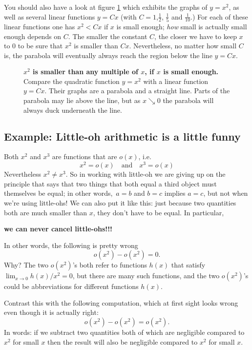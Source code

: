 You should also have a look at figure \ref{fig:parabola-wins} which
exhibits the graphs of $y=x^2$, as well as several linear functions $y=Cx$
(with $C=1$,$\frac12$, $\frac15$ and $\frac1{10}$.) For each of these
linear functions one has $x^2<Cx$ if $x$ is small enough; \textit{how}
small is actually small enough depends on $C$. The smaller the constant
$C$, the closer we  have to keep $x$ to $0$ to be sure that $x^2$ is
smaller than $Cx$. Nevertheless, no matter how small $C$ is, the parabola
will eventually always reach the region below the line $y=Cx$.
\begin{figure}[t]
  \centering \small  \normalsize
  \caption{\textbf{$x^2$ is smaller than any multiple of $x$, if $x$ is
  small enough. } Compare the quadratic function $y=x^2$ with a linear
  function $y=Cx$.  Their graphs are a parabola and a straight line.
  Parts of the parabola may lie above the line, but as $x\searrow0$ the
  parabola will always duck underneath the line.  }
  \label{fig:parabola-wins}
\end{figure}

\subsection{Example: Little-oh arithmetic is a little funny} %
\label{sec:little-oh-weirdness}
Both $x^2$ and $x^3$ are functions that are $o (x)$, i.e.
\[
x^2=o (x) \quad\text{and}\quad x^3=o (x)
\]
Nevertheless $x^2\neq x^3$. So in working with little-oh we are giving up
on the principle that says that two things that both equal a third object
must themselves be equal; in other words,~$a=b$ and $b=c$ implies $a=c$,
but not when we're using little-ohs! We can also put it like this: just
because two quantities both are much smaller than $x$, they don't have to
be equal. In particular,
\begin{center}\color{badgerred}
  \textbf{we can never cancel little-ohs!!! }
\end{center}
In other words, the following is pretty wrong
\[
o (x^2)-o (x^2)=0.
\]
Why? The two $o (x^2)$'s both refer to functions $h (x)$ that satisfy
$\lim_{x\to0}h(x)/x^2=0$, but there are many such functions, and the two $o
(x^2)$'s could be abbreviations for different functions $h(x)$.

Contrast this with the following computation, which at first sight looks
wrong even though it is actually right:
\[
o (x^2)-o (x^2) = o (x^2).
\]
In words: if we  subtract two quantities both of which are negligible
compared to $x^2$ for small $x$ then the result will also be negligible
compared to $x^2$ for small $x$.



